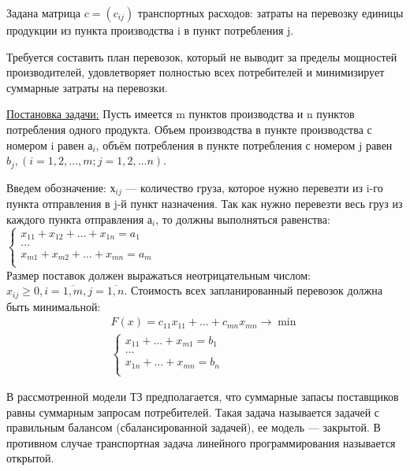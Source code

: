 \documentclass[a4paper, 12pt]{article}
\begin{document}
Задана матрица $c=(c_{ij})$ транспортных расходов: затраты на перевозку единицы продукции из пункта производства i в пункт потребления j.

Требуется составить план перевозок, который не выводит за пределы мощностей производителей, удовлетворяет полностью всех потребителей и минимизирует суммарные затраты на перевозки.

\underline{Постановка задачи:} Пусть имеется m пунктов производства и n пунктов потребления одного продукта. Объем производства в пункте производства с номером i равен $а_i$, объём потребления в пункте потребления с номером j равен $b_j, (i=1,2,…,m; j= 1,2,…n)$.

Введем обозначение: $х_{ij}$ — количество груза, которое нужно перевезти из i-го пункта отправления в j-й пункт назначения. Так как нужно перевезти весь груз из каждого пункта отправления $а_i$‚ то должны выполняться равенства:\\

\begin{math}
  \begin{cases}
    x_{11}+x_{12}+\ldots+x_{1n}=a_1\\
    \ldots\\
    x_{m1}+x_{m2}+\ldots+x_{mn}=a_m\\
  \end{cases}
\end{math}\\

Размер поставок должен выражаться неотрицательным числом: $x_{ij}\geq0,i=\overline{1,m} ,j=\overline{1,n} $. Стоимость всех запланированный перевозок должна быть минимальной:
\begin{align*}
  F(x)= c_{11}x_{11}+\ldots+c_{mn}x_{mn}\rightarrow \min\\
  \begin{cases}
    x_{11}+\ldots+x_{m1} = b_1\\
    \ldots\\
    x_{1n}+\ldots+x_{mn} = b_n\\
  \end{cases}
\end{align*}

В рассмотренной модели ТЗ предполагается, что суммарные запасы поставщиков равны суммарным запросам потребителей. Такая задача называется задачей с правильным балансом (сбалансированной задачей), ее модель — закрытой. В противном случае транспортная задача линейного программирования называется открытой.
\end{document}
